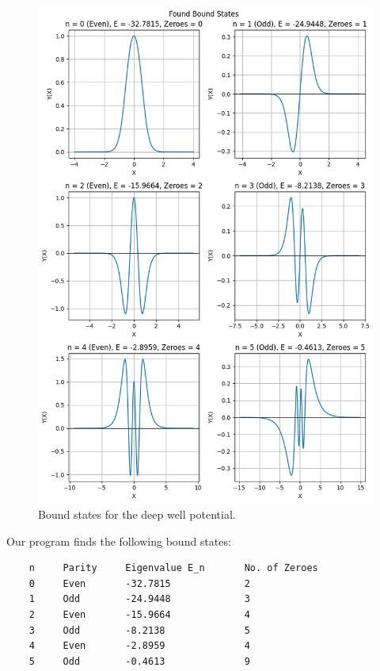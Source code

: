 \documentclass{article}
\begin{document}
\begin{figure}
    \centering
    \includegraphics[width=1\linewidth]{images/bound_states.png}
    \caption{Bound states for the deep well potential.}
    \label{fig:placeholder}
\end{figure}

Our program finds the following bound states:

\begin{verbatim}
    n     Parity     Eigenvalue E_n       No. of Zeroes    
    0     Even       -32.7815             2                   
    1     Odd        -24.9448             3                   
    2     Even       -15.9664             4                   
    3     Odd        -8.2138              5                   
    4     Even       -2.8959              4                   
    5     Odd        -0.4613              9           
\end{verbatim}
\end{document}
